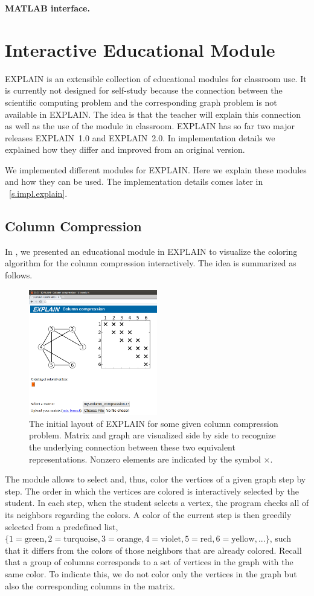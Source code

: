 \documentclass[12pt, oneside]{book}
\begin{document}
\textbf{MATLAB interface.}

\chapter{Interactive Educational Module}
\label{explain}
\mbox{EXPLAIN} is an extensible collection of educational modules for classroom use.
It is currently not designed for self-study because the connection between the scientific computing problem and the corresponding graph problem is not available in \mbox{EXPLAIN}. The idea is that the teacher will explain this connection as well as the use of the module in classroom.
EXPLAIN has so far two major releases \mbox{EXPLAIN 1.0} and \mbox{EXPLAIN 2.0}.
In implementation details we explained how they differ and improved from an original version.

We implemented different modules for EXPLAIN. 
Here we explain these modules and how they can be used.
The implementation details comes later in ~\ref{s.impl.explain}.
\section{Column Compression}
\label{s.column-compression}
In \cite{2013:05,2014:01}, we presented an educational module in \mbox{EXPLAIN} to visualize the
coloring algorithm for the column compression interactively. The idea is 
summarized as follows.

\begin{figure}
\centering
\includegraphics[width=0.5\textwidth]{fig1.png}
\caption{The initial layout of EXPLAIN for some given column compression problem. Matrix and graph are visualized side by side to recognize the underlying connection between these two equivalent representations. Nonzero elements are indicated by the symbol $\times$.
}
\label{fig1}
\end{figure}
The module allows to select and, thus, color the vertices of a given graph step by step. The order in which the vertices are colored is interactively selected by the student. In each step, when the student selects a vertex, the program checks all of its neighbors regarding the colors. A color of the current step is then greedily selected from a predefined list, $\{1=\text{green}, 2=\text{turquoise}, 3=\text{orange}, 4=\text{violet}, 5=\text{red}, 6=\text{yellow}, ...\}$, such that it differs from the colors of those neighbors that are already colored. Recall that a group of columns corresponds to a set of vertices in the graph with the same color. To indicate this, we do not color only the vertices in the graph but also the corresponding columns in the matrix.
\end{document}
